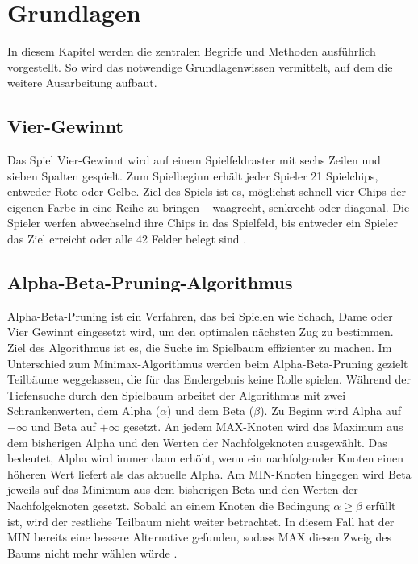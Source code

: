\chapter{Grundlagen}
In diesem Kapitel werden die zentralen Begriffe und Methoden ausführlich vorgestellt. So wird das notwendige Grundlagenwissen vermittelt, auf dem die weitere Ausarbeitung aufbaut.

\section{Vier-Gewinnt}
Das Spiel Vier-Gewinnt wird auf einem Spielfeldraster mit sechs Zeilen und sieben Spalten gespielt. Zum Spielbeginn erhält jeder Spieler 21 Spielchips, entweder Rote oder Gelbe. Ziel des Spiels ist es, möglichst schnell vier Chips der eigenen Farbe in eine Reihe zu bringen – waagrecht, senkrecht oder diagonal. Die Spieler werfen abwechselnd ihre Chips in das Spielfeld, bis entweder ein Spieler das Ziel erreicht oder alle 42 Felder belegt sind \autocite{Hasbro.2020}.

\section{Alpha-Beta-Pruning-Algorithmus}
Alpha-Beta-Pruning ist ein Verfahren, das bei Spielen wie Schach, Dame oder Vier Gewinnt eingesetzt wird, um den optimalen nächsten Zug zu bestimmen. Ziel des Algorithmus ist es, die Suche im Spielbaum effizienter zu machen. Im Unterschied zum Minimax-Algorithmus werden beim Alpha-Beta-Pruning gezielt Teilbäume weggelassen, die für das Endergebnis keine Rolle spielen.
Während der Tiefensuche durch den Spielbaum arbeitet der Algorithmus mit zwei Schrankenwerten, dem Alpha ($\alpha$) und dem Beta ($\beta$). Zu Beginn wird Alpha auf $-\infty$ und Beta auf $+\infty$ gesetzt.
An jedem MAX-Knoten wird das Maximum aus dem bisherigen Alpha und den Werten der Nachfolgeknoten ausgewählt. Das bedeutet, Alpha wird immer dann erhöht, wenn ein nachfolgender Knoten einen höheren Wert liefert als das aktuelle Alpha.
Am MIN-Knoten hingegen wird Beta jeweils auf das Minimum aus dem bisherigen Beta und den Werten der Nachfolgeknoten gesetzt.
Sobald an einem Knoten die Bedingung $\alpha \geq \beta$ erfüllt ist, wird der restliche Teilbaum nicht weiter betrachtet. In diesem Fall hat der MIN bereits eine bessere Alternative gefunden, sodass MAX diesen Zweig des Baums nicht mehr wählen würde \autocite{adorf2009alphabeta}.


